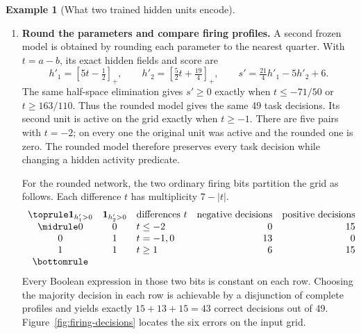 \documentclass[11pt,a4paper]{article}
\theoremstyle{definition}
\newtheorem{example}[example]{Example}
\theoremstyle{remark}\newaliascnt{remark}{theorem}
\numberwithin{equation}{section}
\begin{document}
\begin{example}[What two trained hidden units encode]
\begin{enumerate}[titledsteps]
On the entire integer task domain the hidden \emph{activity predicates} simplify further:
\[
 h_1>0\ \Longleftrightarrow\ a-b\ge1,\qquad
 h_2>0\ \Longleftrightarrow\ a-b\ge-2 .
\]
There is a short integer certificate for the two signs. Set \(D=2^{53}\), \(U_i=Du_i\), and write \(K_1=1,K_2=-2\). For each \(t=a-b\), substitute \(a=t+b\) and take the endpoints of
\(\max(-3,-3-t)\le b\le\min(3,3-t)\), since \(U_i(t+b,b)\) is affine in \(b\). Taking extrema over the thirteen integer differences gives
\[
\begin{array}{c|r|r}
 i&\max_{t<K_i} U_i&\min_{t\ge K_i} U_i\\ \hline
 1&-3854979318750145&41129954702709847\\
 2&-21844050949848952&6928107057228
\end{array}
\]
For the score, let \(V_i=Dv_i\), \(C=Dc\), and \(S=DC+V_1[U_1]_++V_2[U_2]_+=D^2s\). Enumerating \(a,b=-3,\ldots,3\) gives \(S<-6D^2\) on the 19 negative labels and \(S>5D^2\) on the 30 positive labels. Splitting the same comparisons by \((a+2b)\bmod4\) gives 38 correct training and 11 correct held-out decisions. At \((1,0),(2,0)\) both activity bits are one, while the decisions are zero and one.


    \item \textbf{Round the parameters and compare firing profiles.} A second frozen model is obtained by rounding each parameter to the nearest quarter. With $t=a-b$, its exact hidden fields and score are
\[
 h'_1=[5t-\tfrac12]_+,\qquad h'_2=[\tfrac52t+\tfrac{19}4]_+,\qquad
 s'=\tfrac{21}4h'_1-5h'_2+6 .
\]
The same half-space elimination gives $s'\ge0$ exactly when $t\le-71/50$ or $t\ge163/110$. Thus the rounded model gives the same 49 task decisions. Its second unit is active on the grid exactly when $t\ge-1$. There are five pairs with $t=-2$; on every one the original unit was active and the rounded one is zero. The rounded model therefore preserves every task decision while changing a hidden activity predicate.

For the rounded network, the two ordinary firing bits partition the grid as follows. Each difference $t$ has multiplicity $7-|t|$.
\[
\begin{array}{cclrr}
\toprule
 \mathbf1_{h'_1>0} & \mathbf1_{h'_2>0} &\text{differences }t
 &\text{negative decisions}&\text{positive decisions}\\
\midrule
 0&0&t\le -2 &0&15\\
 0&1&t=-1,0  &13&0\\
 1&1&t\ge 1  &6&15\\
\bottomrule
\end{array}
\]
Every Boolean expression in those two bits is constant on each row. Choosing the majority decision in each row is achievable by a disjunction of complete profiles and yields exactly $15+13+15=43$ correct decisions out of 49. Figure~\ref{fig:firing-decisions} locates the six errors on the input grid.


\end{enumerate}
\end{example}
\end{document}
